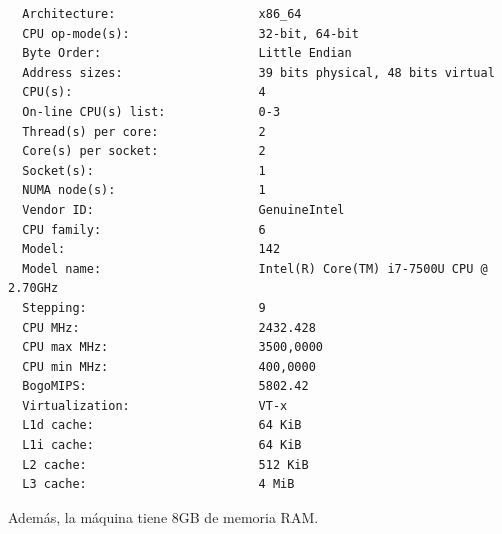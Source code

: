 \documentclass[11pt]{article}
\begin{document}
\begin{lstlisting}
  Architecture:                    x86_64
  CPU op-mode(s):                  32-bit, 64-bit
  Byte Order:                      Little Endian
  Address sizes:                   39 bits physical, 48 bits virtual
  CPU(s):                          4
  On-line CPU(s) list:             0-3
  Thread(s) per core:              2
  Core(s) per socket:              2
  Socket(s):                       1
  NUMA node(s):                    1
  Vendor ID:                       GenuineIntel
  CPU family:                      6
  Model:                           142
  Model name:                      Intel(R) Core(TM) i7-7500U CPU @ 2.70GHz
  Stepping:                        9
  CPU MHz:                         2432.428
  CPU max MHz:                     3500,0000
  CPU min MHz:                     400,0000
  BogoMIPS:                        5802.42
  Virtualization:                  VT-x
  L1d cache:                       64 KiB
  L1i cache:                       64 KiB
  L2 cache:                        512 KiB
  L3 cache:                        4 MiB
  \end{lstlisting}

Además, la máquina tiene 8GB de memoria RAM.

\pagebreak


\end{document}
